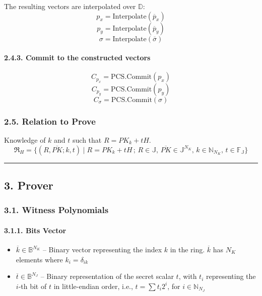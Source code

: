 \documentclass[
]{article}
\begin{document}
The resulting vectors are interpolated over \(\mathbb{D}\):
\[p_x = \text{Interpolate}(\overline{p}_x)\]
\[p_y = \text{Interpolate}(\overline{p}_y)\]
\[\sigma = \text{Interpolate}(\overline{\sigma})\]

\paragraph{2.4.3. Commit to the constructed
vectors}\label{commit-to-the-constructed-vectors}

\[C_{p_x} = \text{PCS.Commit}(p_x)\]
\[C_{p_y} = \text{PCS.Commit}(p_y)\]
\[C_\sigma = \text{PCS.Commit}(\sigma)\]

\subsubsection{2.5. Relation to Prove}\label{relation-to-prove}

Knowledge of \(k\) and \(t\) such that \(R = PK_k + tH\).
\[\mathfrak{R}_H = \{ (R, \overline{PK}; k, t) \mid R = PK_k + tH \,;\, R \in \mathbb{J}, \, \overline{PK} \in \mathbb{J}^{N_K}, \, k \in \mathbb{N}_{N_K}, \, t \in \mathbb{F_J} \}\]

\begin{center}\rule{0.5\linewidth}{0.5pt}\end{center}

\subsection{3. Prover}\label{prover}

\subsubsection{3.1. Witness Polynomials}\label{witness-polynomials}

\paragraph{3.1.1. Bits Vector}\label{bits-vector}

\begin{itemize}
\item
  \(\overline{k} \in \mathbb{B}^{N_K}\) -- Binary vector representing
  the index \(k\) in the ring. \(\overline{k}\) has \(N_K\) elements
  where \(k_i = \delta_{ik}\)
\item
  \(\overline{t} \in \mathbb{B}^{N_J}\) -- Binary representation of the
  secret scalar \(t\), with \(t_i\) representing the \(i\)-th bit of
  \(t\) in little-endian order, i.e., \(t = \sum t_i 2^i\), for
  \(i \in \mathbb{N}_{N_J}\)
\end{itemize}
\end{document}

